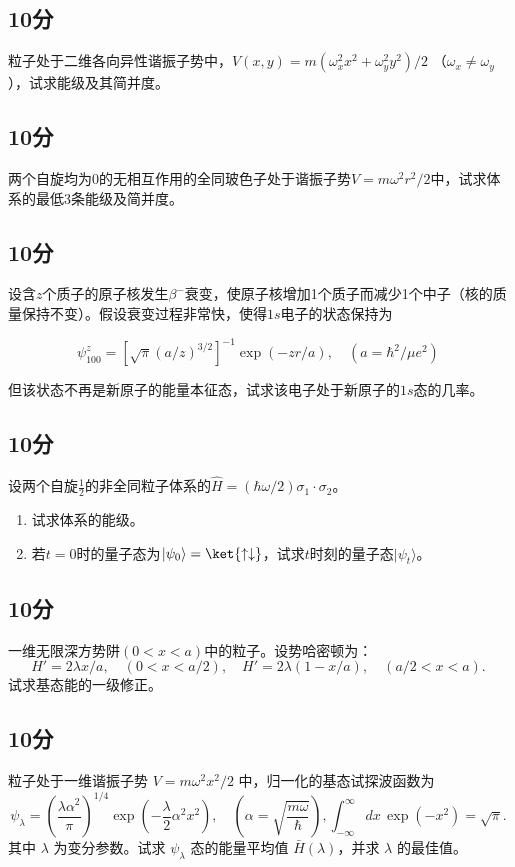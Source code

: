 \subsection{10分}
粒子处于二维各向异性谐振子势中，$V(x, y) = m(\omega_x^2 x^2 + \omega_y^2 y^2)/2$ （$\omega_x \neq \omega_y$），试求能级及其简并度。
\subsection{10分}
两个自旋均为0的无相互作用的全同玻色子处于谐振子势$V = m\omega^2 r^2 / 2$中，试求体系的最低3条能级及简并度。
\subsection{10分}
设含$z$个质子的原子核发生$\beta^-$衰变，使原子核增加1个质子而减少1个中子（核的质量保持不变）。假设衰变过程非常快，使得$1s$电子的状态保持为

    \[
    \psi^z_{100} = \left[ \sqrt{\pi}(a/z)^{3/2} \right]^{-1} \exp(-zr/a), \quad (a = \hbar^2/\mu e^2)~
    \]

    但该状态不再是新原子的能量本征态，试求该电子处于新原子的$1s$态的几率。
\subsection{10分}
设两个自旋$\frac{1}{2}$的非全同粒子体系的$\hat{H} = (\hbar \omega/2)\sigma_1 \cdot \sigma_2$。 
    \begin{enumerate}
        \item 试求体系的能级。
        \item 若$t = 0$时的量子态为$|\psi_0\rangle = \ket{\uparrow \downarrow}$，试求$t$时刻的量子态$|\psi_t\rangle$。
    \end{enumerate}
\subsection{10分}
一维无限深方势阱$ (0 < x < a) $中的粒子。设势哈密顿为：
    \[
    H' = 2\lambda x/a, \quad (0 < x < a/2), \quad H' = 2\lambda(1 - x/a), \quad (a/2 < x < a).~
    \]
    试求基态能的一级修正。
    
\subsection{10分}
粒子处于一维谐振子势 $V = m\omega^2x^2/2$ 中，归一化的基态试探波函数为
\[
\psi_{\lambda} = \left(\frac{\lambda \alpha^2}{\pi}\right)^{1/4} \exp\left(-\frac{\lambda }{2}\alpha^2 x^2\right), \quad \left(\alpha = \sqrt{\frac{m\omega}{\hbar}}\right),\int_{-\infty}^{\infty} dx \, \exp(-x^2) = \sqrt{\pi}.~
\]
其中 $\lambda$ 为变分参数。试求 $\psi_{\lambda}$ 态的能量平均值 $\bar{H}(\lambda)$，并求 $\lambda$ 的最佳值。